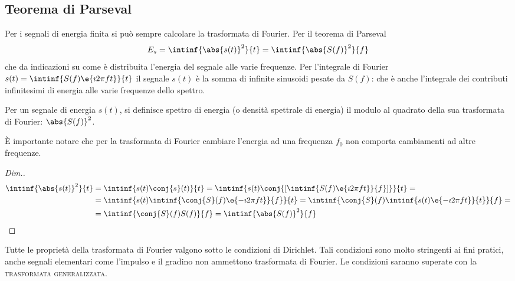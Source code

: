 \subsection{Teorema di Parseval}
Per i segnali di energia finita si può sempre calcolare la trasformata di Fourier. Per il teorema di Parseval
\begin{equation}
\label{eq:parseval}
	E_s=\intinf{\abs{s(t)}^2}{t}=\intinf{\abs{S(f)}^2}{f}
\end{equation}
che da indicazioni su come è distribuita l'energia del segnale alle varie frequenze. Per l'integrale di Fourier $s(t)=\intinf{S(f)\e{\imath 2\pi f t}}{t}$ il segnale $s(t)$ è la somma di infinite sinusoidi pesate da $S(f)$: che è anche l'integrale dei contributi infinitesimi di energia alle varie frequenze dello spettro.
\begin{nota}
	Per un segnale di energia $s(t)$, si definisce spettro di energia (o densità spettrale di energia) il modulo al quadrato della sua trasformata di Fourier: $\abs{S(f)}^2$.
\end{nota}
\begin{nota}
	\`E importante notare che per la trasformata di Fourier cambiare l'energia ad una frequenza $f_0$ non comporta cambiamenti ad altre frequenze.
\end{nota}
\begin{proof}[Dim.]
\begin{align*}
	\intinf{\abs{s(t)}^2}{t}&=\intinf{s(t)\conj{s}(t)}{t}
	=\intinf{s(t)\conj{\left[\intinf{S(f)\e{\imath 2\pi f t}}{f}\right]}}{t}=\\
	&=\intinf{s(t)\intinf{\conj{S}(f)\e{-\imath 2\pi f t}}{f}}{t}=\intinf{\conj{S}(f)\intinf{s(t)\e{-\imath 2\pi f t}}{t}}{f}=\\
	&=\intinf{\conj{S}(f)S(f)}{f}=\intinf{\abs{S(f)}^2}{f}
\qedhere
\end{align*}
\end{proof}

\begin{nota}
	Tutte le proprietà della trasformata di Fourier valgono sotto le condizioni di Dirichlet. Tali condizioni sono molto stringenti ai fini pratici, anche segnali elementari come l'impulso e il gradino non ammettono trasformata di Fourier. Le condizioni saranno superate con la \textsc{trasformata generalizzata}. 
\end{nota}

